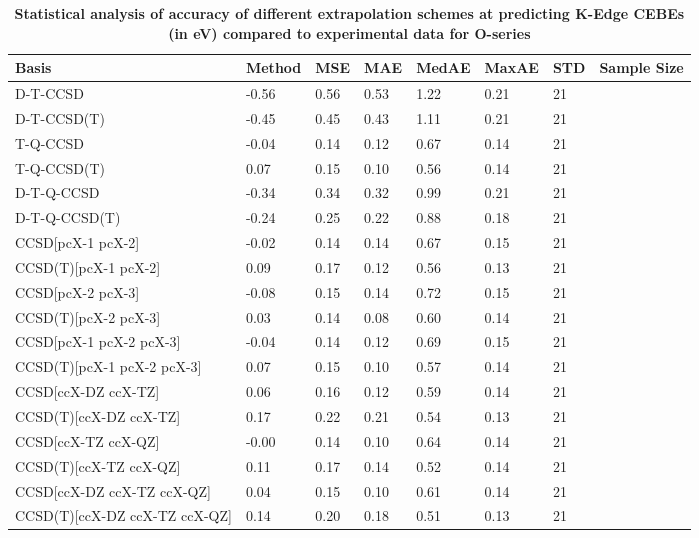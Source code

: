 \begin{table}
  \caption{\textbf{Statistical analysis of accuracy of different extrapolation schemes at predicting K-Edge CEBEs (in eV) compared to experimental data for O-series}}
  \label{tbl:extrap-scheme-summary-o}
  \begin{tabular}{l l l l l l l l }
    \toprule
    \textbf{Basis} & \textbf{Method} & \textbf{MSE} & \textbf{MAE} & \textbf{MedAE} & \textbf{MaxAE} & \textbf{STD} & \textbf{Sample Size} \\ 
    \midrule
    D-T-CCSD & -0.56 & 0.56 & 0.53 & 1.22 & 0.21 & 21 \\ 
    D-T-CCSD(T) & -0.45 & 0.45 & 0.43 & 1.11 & 0.21 & 21 \\ 
    T-Q-CCSD & -0.04 & 0.14 & 0.12 & 0.67 & 0.14 & 21 \\ 
    T-Q-CCSD(T) & 0.07 & 0.15 & 0.10 & 0.56 & 0.14 & 21 \\ 
    D-T-Q-CCSD & -0.34 & 0.34 & 0.32 & 0.99 & 0.21 & 21 \\ 
    D-T-Q-CCSD(T) & -0.24 & 0.25 & 0.22 & 0.88 & 0.18 & 21 \\ 
    CCSD[pcX-1 pcX-2] & -0.02 & 0.14 & 0.14 & 0.67 & 0.15 & 21 \\ 
    CCSD(T)[pcX-1 pcX-2] & 0.09 & 0.17 & 0.12 & 0.56 & 0.13 & 21 \\ 
    CCSD[pcX-2 pcX-3] & -0.08 & 0.15 & 0.14 & 0.72 & 0.15 & 21 \\ 
    CCSD(T)[pcX-2 pcX-3] & 0.03 & 0.14 & 0.08 & 0.60 & 0.14 & 21 \\ 
    CCSD[pcX-1 pcX-2 pcX-3] & -0.04 & 0.14 & 0.12 & 0.69 & 0.15 & 21 \\ 
    CCSD(T)[pcX-1 pcX-2 pcX-3] & 0.07 & 0.15 & 0.10 & 0.57 & 0.14 & 21 \\ 
    CCSD[ccX-DZ ccX-TZ] & 0.06 & 0.16 & 0.12 & 0.59 & 0.14 & 21 \\ 
    CCSD(T)[ccX-DZ ccX-TZ] & 0.17 & 0.22 & 0.21 & 0.54 & 0.13 & 21 \\ 
    CCSD[ccX-TZ ccX-QZ] & -0.00 & 0.14 & 0.10 & 0.64 & 0.14 & 21 \\ 
    CCSD(T)[ccX-TZ ccX-QZ] & 0.11 & 0.17 & 0.14 & 0.52 & 0.14 & 21 \\ 
    CCSD[ccX-DZ ccX-TZ ccX-QZ] & 0.04 & 0.15 & 0.10 & 0.61 & 0.14 & 21 \\ 
    CCSD(T)[ccX-DZ ccX-TZ ccX-QZ] & 0.14 & 0.20 & 0.18 & 0.51 & 0.13 & 21 \\ 
    \bottomrule
  \end{tabular}
\end{table}
